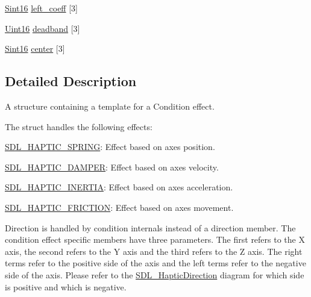 \begin{DoxyCompactItemize}
\item 
\hyperlink{SDL__stdinc_8h_a9d0257032c0e146ab6121bf0122712f5}{Sint16} \hyperlink{structSDL__HapticCondition_a2adf52c32f60f0b6826b1e3add2eae7a}{left\+\_\+coeff} \mbox{[}3\mbox{]}
\item 
\hyperlink{SDL__stdinc_8h_a31fcc0a076c9068668173ee26d33e42b}{Uint16} \hyperlink{structSDL__HapticCondition_af684c8eeeb719739a32723c00c5a2bbd}{deadband} \mbox{[}3\mbox{]}
\item 
\hyperlink{SDL__stdinc_8h_a9d0257032c0e146ab6121bf0122712f5}{Sint16} \hyperlink{structSDL__HapticCondition_a8a71ec28ff5ab85246cbc59736aa2c53}{center} \mbox{[}3\mbox{]}
\end{DoxyCompactItemize}


\subsection{Detailed Description}
A structure containing a template for a Condition effect. 

The struct handles the following effects\+:
\begin{DoxyItemize}
\item \hyperlink{SDL__haptic_8h_a3b52d4700380085e2b5d87bb20320fb1}{S\+D\+L\+\_\+\+H\+A\+P\+T\+I\+C\+\_\+\+S\+P\+R\+I\+N\+G}\+: Effect based on axes position.
\item \hyperlink{SDL__haptic_8h_a69522f261973e3ea4273486141320a87}{S\+D\+L\+\_\+\+H\+A\+P\+T\+I\+C\+\_\+\+D\+A\+M\+P\+E\+R}\+: Effect based on axes velocity.
\item \hyperlink{SDL__haptic_8h_a14b807471589120395aec28293cf6642}{S\+D\+L\+\_\+\+H\+A\+P\+T\+I\+C\+\_\+\+I\+N\+E\+R\+T\+I\+A}\+: Effect based on axes acceleration.
\item \hyperlink{SDL__haptic_8h_a98a5011311168d63921aaac21403a4d8}{S\+D\+L\+\_\+\+H\+A\+P\+T\+I\+C\+\_\+\+F\+R\+I\+C\+T\+I\+O\+N}\+: Effect based on axes movement.
\end{DoxyItemize}

Direction is handled by condition internals instead of a direction member. The condition effect specific members have three parameters. The first refers to the X axis, the second refers to the Y axis and the third refers to the Z axis. The right terms refer to the positive side of the axis and the left terms refer to the negative side of the axis. Please refer to the \hyperlink{structSDL__HapticDirection}{S\+D\+L\+\_\+\+Haptic\+Direction} diagram for which side is positive and which is negative.

